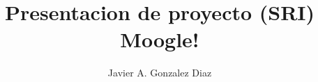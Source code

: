 \documentclass[aspectradio=4:3]{beamer}
\title{Presentacion de proyecto (SRI) Moogle!}
\author{Javier A. Gonzalez Diaz}
\institute{Facultad de Matemática y Computación}
\begin{document}
\begin{frame}
    \maketitle

\end{frame}    
 


\end{document}
